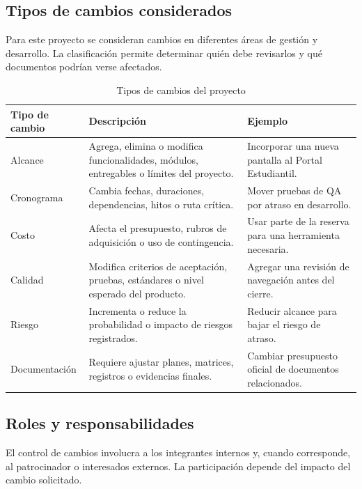 \documentclass[11pt,spanish]{article}
\begin{document}
\subsection{Tipos de cambios considerados}

Para este proyecto se consideran cambios en diferentes áreas de gestión y desarrollo. La clasificación permite determinar quién debe revisarlos y qué documentos podrían verse afectados.

\begin{table}[H]
\centering
\caption{Tipos de cambios del proyecto}
\label{tab:tipos-cambios}
{\small
\begin{tabularx}{\textwidth}{p{3.5cm} Y p{3.2cm}}
\toprule
\textbf{Tipo de cambio} & \textbf{Descripción} & \textbf{Ejemplo} \\
\midrule
Alcance & Agrega, elimina o modifica funcionalidades, módulos, entregables o límites del proyecto. & Incorporar una nueva pantalla al Portal Estudiantil. \\
Cronograma & Cambia fechas, duraciones, dependencias, hitos o ruta crítica. & Mover pruebas de QA por atraso en desarrollo. \\
Costo & Afecta el presupuesto, rubros de adquisición o uso de contingencia. & Usar parte de la reserva para una herramienta necesaria. \\
Calidad & Modifica criterios de aceptación, pruebas, estándares o nivel esperado del producto. & Agregar una revisión de navegación antes del cierre. \\
Riesgo & Incrementa o reduce la probabilidad o impacto de riesgos registrados. & Reducir alcance para bajar el riesgo de atraso. \\
Documentación & Requiere ajustar planes, matrices, registros o evidencias finales. & Cambiar presupuesto oficial de documentos relacionados. \\
\bottomrule
\end{tabularx}
}
\end{table}

\subsection{Roles y responsabilidades}

El control de cambios involucra a los integrantes internos y, cuando corresponde, al patrocinador o interesados externos. La participación depende del impacto del cambio solicitado.
\end{document}
